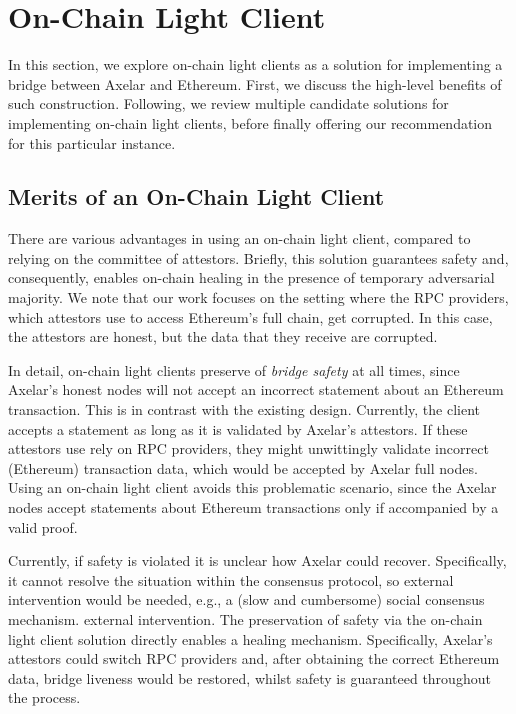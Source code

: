 \section{On-Chain Light Client}

In this section, we explore on-chain light clients as a solution for
implementing a bridge between Axelar and Ethereum. First, we discuss the
high-level benefits of such construction. Following, we review multiple
candidate solutions for implementing on-chain light clients, before finally
offering our recommendation for this particular instance.

\subsection{Merits of an On-Chain Light Client}

There are various advantages in using an on-chain light client, compared to
relying on the committee of attestors. Briefly, this solution guarantees safety
and, consequently, enables on-chain healing in the presence of temporary
adversarial majority.  We note that our work focuses on the setting where the
RPC providers, which attestors use to access Ethereum's full chain, get
corrupted. In this case, the attestors are honest, but the data that they
receive are corrupted.

In detail, on-chain light clients preserve of \emph{bridge safety} at all
times, since Axelar's honest nodes will not accept an
incorrect statement about an Ethereum transaction.
%
This is in contrast with the existing design. Currently, the client accepts a
statement as long as it is validated by Axelar's attestors. If these attestors
use rely on RPC providers, they might unwittingly validate incorrect (Ethereum)
transaction data, which would be accepted by Axelar full nodes. Using an
on-chain light client avoids this problematic scenario, since the Axelar nodes
accept statements about Ethereum transactions only if accompanied by a valid
proof. 

Currently, if safety is violated it is unclear how Axelar could recover.
Specifically, it cannot resolve the situation within the consensus protocol, so
external intervention would be needed, e.g., a (slow and cumbersome) social
consensus mechanism.  external intervention.
The preservation of safety via the on-chain light client solution directly
enables a healing mechanism. Specifically, Axelar's attestors could switch RPC
providers and, after obtaining the correct Ethereum data, bridge liveness would
be restored, whilst safety is guaranteed throughout the process.


